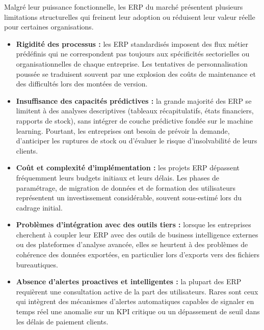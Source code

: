 \documentclass[a4paper,12pt]{report}
\begin{document}
Malgré leur puissance fonctionnelle, les ERP du marché présentent plusieurs
limitations structurelles qui freinent leur adoption ou réduisent leur valeur
réelle pour certaines organisations.

\begin{itemize}
    \item \textbf{Rigidité des processus :} les ERP standardisés imposent des
    flux métier prédéfinis qui ne correspondent pas toujours aux spécificités
    sectorielles ou organisationnelles de chaque entreprise. Les tentatives de
    personnalisation poussée se traduisent souvent par une explosion des coûts
    de maintenance et des difficultés lors des montées de version.

    \item \textbf{Insuffisance des capacités prédictives :} la grande majorité
    des ERP se limitent à des analyses descriptives (tableaux récapitulatifs, états financiers, rapports de stock), sans intégrer de couche prédictive
    fondée sur le machine learning. Pourtant, les entreprises ont besoin de
    prévoir la demande, d'anticiper les ruptures de stock ou d'évaluer le risque
    d'insolvabilité de leurs clients.

    \item \textbf{Coût et complexité d'implémentation :} les projets ERP
    dépassent fréquemment leurs budgets initiaux et leurs délais. Les phases de
    paramétrage, de migration de données et de formation des utilisateurs
    représentent un investissement considérable, souvent sous-estimé lors du
    cadrage initial.

    \item \textbf{Problèmes d'intégration avec des outils tiers :} lorsque les
    entreprises cherchent à coupler leur ERP avec des outils de business
    intelligence externes ou des plateformes d'analyse avancée, elles se
    heurtent à des problèmes de cohérence des données exportées, en particulier
    lors d'exports vers des fichiers bureautiques.

    \item \textbf{Absence d'alertes proactives et intelligentes :} la plupart
    des ERP requièrent une consultation active de la part des utilisateurs.
    Rares sont ceux qui intègrent des mécanismes d'alertes automatiques capables
    de signaler en temps réel une anomalie sur un KPI critique ou un dépassement
    de seuil dans les délais de paiement clients.
\end{itemize}
\end{document}

